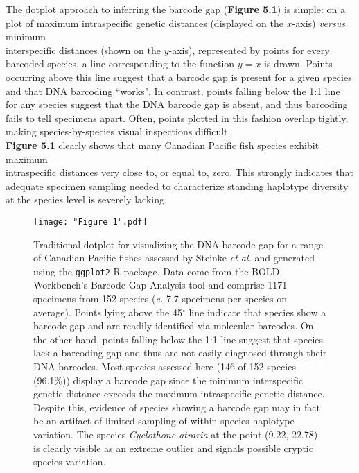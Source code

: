 The dotplot approach to inferring the barcode gap (\textbf{Figure 5.1}) is simple: on a plot of maximum intraspecific genetic distances (displayed on the $x$-axis) \textit{versus} minimum \\ interspecific distances (shown on the $y$-axis), represented by points for every barcoded species, a line corresponding to the function $y=x$ is drawn. Points occurring above this line suggest that a barcode gap is present for a given species and that DNA barcoding ``works". In contrast, points falling below the 1:1 line for any species suggest that the DNA barcode gap is absent, and thus barcoding fails to tell specimens apart. Often, points plotted in this fashion overlap tightly, making species-by-species visual inspections difficult. \\ \textbf{Figure 5.1} clearly shows that many Canadian Pacific fish species exhibit maximum 
\\ intraspecific distances very close to, or equal to, zero. This strongly indicates that adequate specimen sampling needed to characterize standing haplotype diversity at the species level is severely lacking.

\begin{figure}[H]

\centering

\texttt{[image: "Figure 1".pdf]}

\caption[Depiction of the DNA barcode gap as a traditional dotpot for Canadian Pacific fishes assessed by Steinke \textit{et al.} \cite{steinke2009dna}.]{Traditional dotplot for visualizing the DNA barcode gap for a range of Canadian Pacific fishes assessed by Steinke \textit{et al.} \cite{steinke2009dna} and generated using the {\tt ggplot2} \cite{wickham2016ggplot2} R package. Data come from the BOLD Workbench's Barcode Gap Analysis tool and comprise 1171 specimens from 152 species (\textit{c.} 7.7 specimens per species on average). Points lying above the 45$^{\circ}$ line indicate that species show a barcode gap and are readily identified via molecular barcodes. On the other hand, points falling below the 1:1 line suggest that species lack a barcoding gap and thus are not easily diagnosed through their DNA barcodes. Most species assessed here (146 of 152 species (96.1\%)) display a barcode gap since the minimum interspecific genetic distance exceeds the maximum intraspecific genetic distance. Despite this, evidence of species showing a barcode gap may in fact be an artifact of limited sampling of within-species haplotype variation. The species \textit{Cyclothone atraria} at the point (9.22, 22.78) is clearly visible as an extreme outlier and signals possible cryptic species variation.}
\end{figure}



